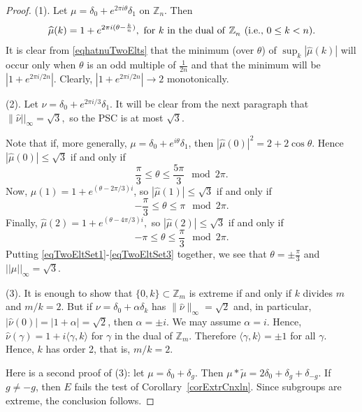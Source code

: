 \documentclass[letter,11pt]{amsart}
\numberwithin{theorem}{section}
\theoremstyle{remark}
\numberwithin{equation}{section}
\newcommand{\corref}[1]{Corollary~\ref{#1}}
\newcommand\Zp[2]{\texttt{$\mathbb Z_{#1}^{\	#2}$}}
\begin{document}
 
\begin{proof} (1). 
Let $\mu = \delta_0 +e^{2\pi i\theta}\delta_1$ on \Zp{n}{}.
Then 
\begin{equation}\label{eqhatnuTwoElts}
\widehat\mu(k)= 1+e^{2\pi i(\theta-\frac{k}{n})},  \text{ for $k$ in the dual of \Zp{n}{} (i.e., $0\le k<n$).}
\end{equation}
 It is clear from \eqref{eqhatnuTwoElts} that the minimum (over $\theta$) of
 $\sup_k|\widehat\mu(k)|$ will occur  only when $\theta$ is an odd 
 multiple of $\frac{1}{2n}$ and that the minimum will be
 $|1+e^{2\pi i/2n}|$. Clearly, $|1+e^{2\pi i/2n}|\to2$ monotonically.
 

(2). Let $\nu = \delta_0+e^{2\pi i/3}\delta_1$. It will be clear from the next paragraph that 
$\|\widehat\nu||_\infty = \sqrt3,$
so the PSC is at most $\sqrt3$.

Note that if, more generally, $\mu = \delta_0+ e^{i\theta}\delta_1$, then $|\widehat\mu(0)|^2 =
{2 +2\cos\theta}$. Hence $|\widehat\mu(0)|\le \sqrt3 $ if and only if 
\begin{equation}\label{eqTwoEltSet1}
\frac\pi3\le\theta\le \frac{5\pi}3 \mod 2\pi.
\end{equation}
Now, $\widehat\mu(1) = 1 + e^{(\theta - 2\pi/3)i}$, so $|\widehat\mu(1)|\le \sqrt3$ if and only if 
\begin{equation}\label{eqTwoEltSet2}
-\frac{\pi}3\le \theta\le {\pi} \mod 2\pi.
\end{equation}
 Finally, $
\widehat\mu(2) = 1 + e^{(\theta-4\pi /3)i},
$
so $|\widehat\mu(2)|\le\sqrt3$ if and only if 
\begin{equation}\label{eqTwoEltSet3}
- \pi\le\theta\le\frac{\pi}3 \mod 2\pi.
\end{equation}
Putting \eqref{eqTwoEltSet1}-\eqref{eqTwoEltSet3} together, we see that
$\theta=\pm \frac\pi3$ and  $||\widehat\mu||_\infty = \sqrt3.$ 

(3). \cite[3.4 (ii)]{MR627683}  It is enough to show that $\{0,k\}\subset \Zp{m}{}$ is extreme if and only if $k$ divides $m$ and $m/k=2$.
But if $\nu = \delta_0+\alpha\delta_k$ has $\|\widehat\nu\|_\infty=\sqrt2$ and, in particular, 
$|\widehat\nu(0)|=|1+\alpha|=\sqrt2$, then $\alpha=\pm i$. We may assume $\alpha=i$. Hence, $\widehat\nu(\gamma) = 1
+ i\langle \gamma,k\rangle$ for $\gamma$ in the dual of \Zp{m}{}. Therefore $\langle\gamma, k\rangle=\pm1$ for all $\gamma$. 
Hence, $k$ has order 2, that is, $m/k=2$.

Here is a second proof of (3):
let $\mu=\delta_0+\delta_g$. Then $\mu*\tilde \mu = 2\delta_0+\delta_g +\delta_{-g}$. If $g\ne -g$, then
$E$ fails the test of \corref{corExtrCnxln}. Since subgroups are extreme, the conclusion follows.
 \end{proof}
\end{document}
